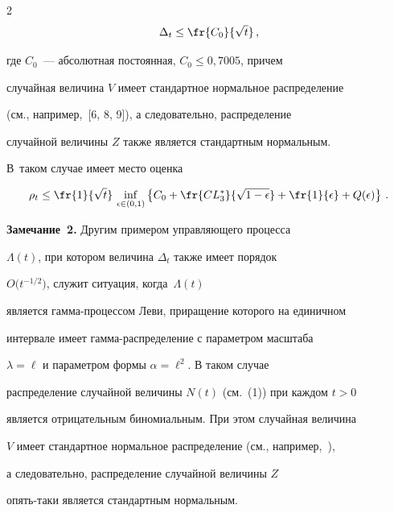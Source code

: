 \begin{multicols}{2}
$$


\Delta_t\le\fr{C_0}{\sqrt{t}}\,,


$$


где $C_0$~--- абсолютная постоянная, $C_0\le 0{,}7005$, причем


случайная величина $V$ имеет стандартное нормальное распределение


(см., например,~[6, 8, 9]), а следовательно, распределение


случайной величины $Z$ также является стандартным нормальным. 


В~таком случае имеет место оценка


$$


\rho_t \leq \fr{1}{\sqrt{t}}\,\inf_{\epsilon\in(0,1)}\left\{C_0+


\fr{CL^*_3}{\sqrt{1-\epsilon}}+\fr{1}{\epsilon}+Q(\epsilon)\right\}\,.


$$





\medskip





\noindent


\textbf{Замечание~2.} Другим примером управляющего процесса


$\Lambda(t)$, при котором величина $\Delta_t$ также имеет порядок


$O\big(t^{-1/2}\big)$, служит ситуация, когда~$\Lambda(t)$


является гамма-процессом Леви, приращение которого на единичном


интервале имеет гам\-ма-рас\-пре\-де\-ле\-ние с параметром масштаба


$\lambda=\ell$ и параметром формы $\alpha=\ell^2$. В таком случае\linebreak


распределение случайной величины $N(t)$ (см.~(1)) при каждом $t>0$


является отрицательным биномиальным. При этом случайная величина


$V$ имеет стандартное нормальное распределение (см., например,~\cite{6a}), 


а следовательно, распределение случайной величины $Z$


опять-таки является стандартным нормальным.





\medskip






\end{multicols}
